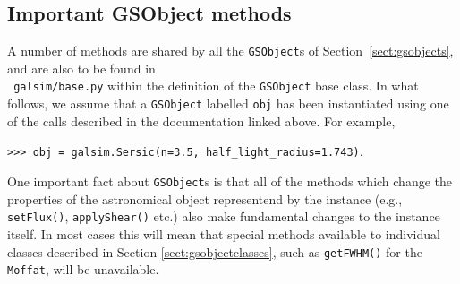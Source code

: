 \documentclass[preprint,11pt]{aastex}
\begin{document}
\subsection{Important GSObject methods}\label{sect:gsobjectmethods}
A number of methods are shared by all the \texttt{GSObject}s of
Section~\ref{sect:gsobjects}, and are also to be found in \\ {\tt
 galsim/base.py} within the definition of the
\texttt{GSObject} base class.  In what follows, we assume that a
\texttt{GSObject} labelled \texttt{obj} has been instantiated using
one of the calls described in the documentation linked above.  For
example,

{\tt >>> obj = galsim.Sersic(n=3.5, half\_light\_radius=1.743)}.

One important fact about \texttt{GSObject}s is that all of the
methods which change the properties of the astronomical object
representend by the instance (e.g., \texttt{setFlux()},
  \texttt{applyShear()} etc.) also make fundamental changes to the
  instance itself.  In most cases this will mean that special methods
  available to individual classes described in Section
  \ref{sect:gsobjectclasses}, such as \texttt{getFWHM()} for the
  \texttt{Moffat}, will be unavailable.
\end{document}
